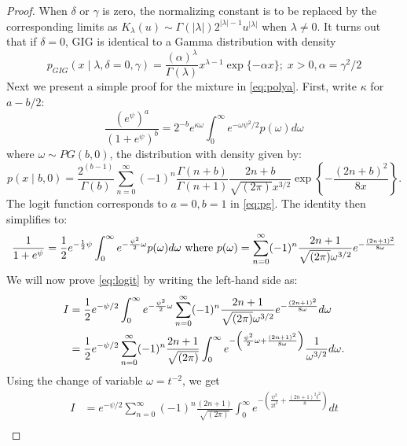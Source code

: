 \documentclass[lineno]{biometrika}
\begin{document}
\begin{proof}
When $\delta$ or $\gamma$ is zero, the normalizing constant is to be replaced by the corresponding limits as $K_{\lambda}(u) \sim \Gamma(|\lambda|)2^{|\lambda|-1} u^{|\lambda|}$ when $\lambda \neq 0$. It turns out that if $\delta=0$, GIG is identical to a Gamma distribution with density 
$$
p_{GIG}(x \mid \lambda, \delta = 0 , \gamma) = \frac{(\alpha)^{\lambda}}{\Gamma(\lambda)} x^{\lambda-1} \exp\{ -\alpha x \}; \; x > 0, \alpha = \gamma^2 / 2 
$$
%
Next we present a simple proof for the \PG mixture in \eqref{eq:polya}. First, write $\kappa$ for $a-b/2$: 
\begin{equation}
  \frac{(e^{\psi})^a}{(1+e^{\psi})^b} = 2^{-b} e^{\kappa \omega} \int_0^{\infty} e^{-\omega \psi^2/2} p(\omega) d\omega \label{eq:pg}
\end{equation}
where $\omega \sim PG(b,0)$, the \PG distribution with density given by: 
$$
p(x \mid b, 0) = \frac{2^{(b-1)}}{\Gamma(b)} \sum_{n=0}^{\infty} (-1)^n \frac{\Gamma(n+b)}{\Gamma(n+1)} \frac{2n+b}{\sqrt{(2\pi)} x^{3/2}} \exp \left\{-\frac{(2n+b)^2}{8x} \right\}.
$$
The logit function corresponds to $a=0,b=1$ in \eqref{eq:pg}. The \CS identity then simplifies to:  
\begin{equation}
  \frac{1}{1+e^{\psi}} = \half e^{-\half \psi} \int_0^{\infty} e^{-\frac{\psi^2}{2} \omega} p(\omega) d\omega 
  \text{ where } p(\omega) = \sum_{n=0}^{\infty} (-1)^n \frac{2n+1}{\sqrt{(2\pi)} \omega^{3/2}} e^{-\frac{(2n+1)^2}{8\omega}}
  \label{eq:logit}
\end{equation}
We will now prove \eqref{eq:logit} by writing the left-hand side as:
\begin{align*}
I & = \frac{1}{2} e^{-\psi/2} \int_0^{\infty} e^{-\frac{\psi^2}{2} \omega} \sum_{n=0}^{\infty} (-1)^n \frac{2n+1}{\sqrt{(2\pi)} \omega^{3/2}} e^{-\frac{(2n+1)^2}{8\omega}}d \omega \\
& = \frac{1}{2} e^{-\psi/2}  \sum_{n=0}^{\infty} (-1)^n \frac{2n+1}{\sqrt{(2\pi)}} \int_0^{\infty} e^{- \left( \frac{\psi^2}{2}  \omega + \frac{(2n+1)^2}{8\omega} \right) } \frac{1}{\omega^{3/2}} d\omega. 
\end{align*}
Using the change of variable $\omega = t^{-2}$, we get 
\begin{align*}
I & = e^{-\psi/2}  \sum_{n=0}^{\infty} (-1)^n \frac{(2n+1)}{\sqrt{(2\pi)}} \int_{0}^{\infty} e^{-\left( \frac{\psi^2}{2t^2} + \frac{(2n+1)^2 t^2}{8} \right)} d t \\

\end{align*}
\end{proof}
\end{document}

